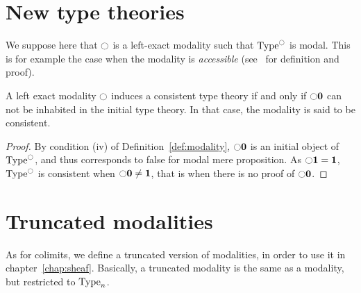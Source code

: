\section{New type theories}
\label{sec:new-type-theories}


We suppose here that $\ocircle$ is a left-exact modality such that
$\operatorname{Type}^{\ocircle}$ is modal.
This is for example the case when the modality is {\em accessible}
(see~\cite{hottlib} for definition and proof).



\begin{prop}\label{prop:consistent}
  A left exact modality $\ocircle$ induces a consistent type theory if
  and only if $\ocircle \mathbf{0}$ can not be inhabited in the initial type
  theory. In that case, the modality is said to be consistent.
\end{prop}
\begin{proof}
  By condition (iv) of Definition~\ref{def:modality},
  $\ocircle \mathbf{0}$ is an initial object of $\operatorname{Type}^{\ocircle}$, and thus
  corresponds to false for modal mere proposition.
  As $\ocircle \mathbf{1} = \mathbf{1}$, $\operatorname{Type}^{\ocircle}$ is consistent when
  $\ocircle \mathbf{0} \neq \mathbf{1}$, that is when there is no proof of
  $\ocircle \mathbf{0}$.
\end{proof}

\section{Truncated modalities}
\label{sec:trunc_modalities}

As for colimits, we define a truncated version of modalities, in order
to use it in chapter~\ref{chap:sheaf}. Basically, a truncated modality
is the same as a modality, but restricted to $\operatorname{Type}_n$. 

